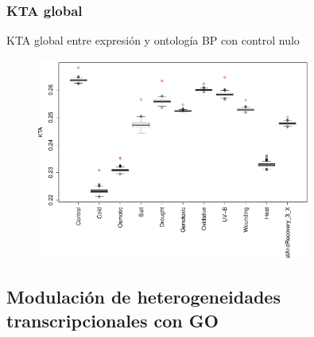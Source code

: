 \documentclass[serif,9pt, t]{beamer}
\begin{document}
\begin{frame}\frametitle{KTA global} 
\centering
KTA global entre expresión y ontología BP con control nulo
\begin{figure}
    	\centering
	\includegraphics[width=0.8\textwidth]{kta_global_bpb.pdf}
\end{figure}
\centering
\end{frame}

\subsection{Modulación de heterogeneidades
transcripcionales con GO}
\end{document}
